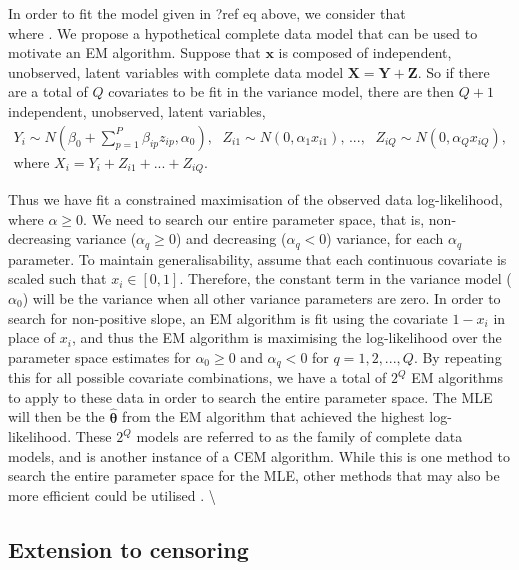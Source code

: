 \documentclass[
]{jss}
\begin{document}
In order to fit the model given in ?ref eq above, we consider that\\
where . We propose a hypothetical complete data model that can be used
to motivate an EM algorithm. Suppose that \(\mathbf{x}\) is composed of
independent, unobserved, latent variables with complete data model
\(\mathbf{X} =\mathbf{Y}+\mathbf{Z}\). So if there are a total of \(Q\)
covariates to be fit in the variance model, there are then \(Q+1\)
independent, unobserved, latent variables, \begin{align*}
 Y_{i} \sim N(\beta_0+ \sum\limits_{p=1}^P \beta_{ip} z_{ip}, \alpha_0)\textrm{,    } ~~
 Z_{i1} \sim N(0, \alpha_1 x_{i1})\textrm{, ...,   } ~~
 Z_{iQ} \sim N(0, \alpha_Q x_{iQ}) ,\\ 
 \textrm{where  } X_i=Y_i+Z_{i1}+...+Z_{iQ}.
  \end{align*}

Thus we have fit a constrained maximisation of the observed data
log-likelihood, where \(\alpha \geq 0\). We need to search our entire
parameter space, that is, non-decreasing variance
(\({\alpha}_q \geq 0\)) and decreasing (\({\alpha}_q < 0\)) variance,
for each \(\alpha_{q}\) parameter. To maintain generalisability, assume
that each continuous covariate is scaled such that \(x_{i} \in [0,1]\).
Therefore, the constant term in the variance model (\(\alpha_0\)) will
be the variance when all other variance parameters are zero. In order to
search for non-positive slope, an EM algorithm is fit using the
covariate \(1-x_i\) in place of \(x_i\), and thus the EM algorithm is
maximising the log-likelihood over the parameter space estimates for
\(\alpha_0 \geq 0\) and \(\alpha_q < 0\) for \(q=1,2,...,Q\). By
repeating this for all possible covariate combinations, we have a total
of \(2^Q\) EM algorithms to apply to these data in order to search the
entire parameter space. The MLE will then be the \(\hat{\bm{\theta}}\)
from the EM algorithm that achieved the highest log-likelihood. These
\(2^Q\) models are referred to as the family of complete data models,
and is another instance of a CEM algorithm. While this is one method to
search the entire parameter space for the MLE, other methods that may
also be more efficient could be utilised
\citep{Donoghoe2016, Marschner2013}. \textbackslash{}

\hypertarget{extension-to-censoring}{%
\subsection{Extension to censoring}\label{extension-to-censoring}}
\end{document}
